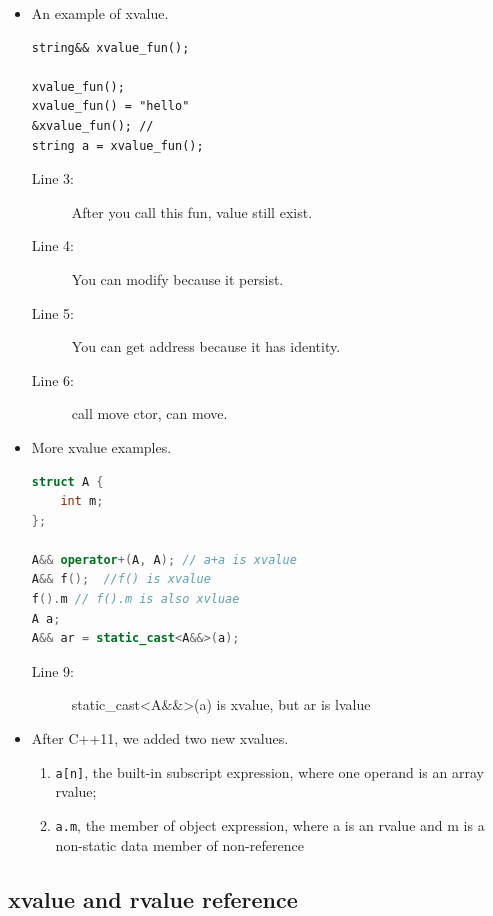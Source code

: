 \documentclass[a4paper,11pt,twoside]{book}
\begin{document}
\begin{itemize}
	

\item An example of xvalue.
\begin{lstlisting}
string&& xvalue_fun();

xvalue_fun(); 
xvalue_fun() = "hello" 
&xvalue_fun(); //
string a = xvalue_fun(); 
\end{lstlisting}
\begin{description}
	\item[Line 3:] After you call this fun, value still exist.
	\item[Line 4:] You can modify because it persist.
	\item[Line 5:] You can get address because it has identity.
	\item[Line 6:] call move ctor, can move.
\end{description}

	

	
	\item More xvalue examples.
\begin{lstlisting}[frame=single, language=c++, mathescape=true]
struct A {
	int m;
};
	
A&& operator+(A, A); // a+a is xvalue
A&& f();  //f() is xvalue
f().m // f().m is also xvluae
A a;
A&& ar = static_cast<A&&>(a);
\end{lstlisting}
\begin{description}
	\item[Line 9:] static\_cast<A\&\&>(a) is xvalue, but ar is lvalue
\end{description}
	
	\item After C++11, we added two new xvalues.
	\begin{enumerate}
		\item \texttt{a[n]}, the built-in subscript expression, where one operand is an array rvalue;
		\item \texttt{a.m}, the member of object expression, where a is an rvalue and m is a non-static data member of non-reference
	\end{enumerate}
\end{itemize}

\subsection{xvalue and rvalue reference}
\end{document}
